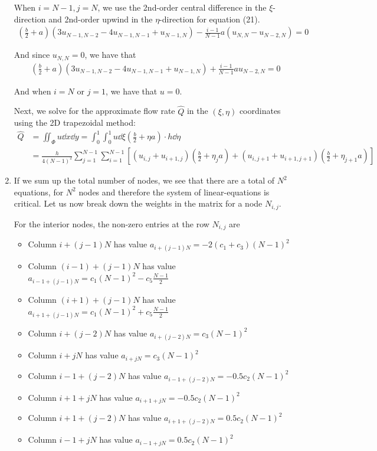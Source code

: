 \begin{enumerate}[label=(\roman*),leftmargin=*,itemsep=0mm]
    When $i = N-1, j = N$, we use the 2nd-order central difference in the $\xi$-direction and 2nd-order upwind in the $\eta$-direction for equation (21).
    \begin{align*}
        \left(\frac{b}{2} + a\right) \left(3u_{N-1,N-2} - 4u_{N-1,N-1} + u_{N-1,N} \right)
        - \frac{i-1}{N-1} a \left( u_{N,N} - u_{N-2,N} \right) = 0
    \end{align*}
    
    And since $u_{N,N} = 0$, we have that
    \begin{align}
        \left(\frac{b}{2} + a\right) \left(3u_{N-1,N-2} - 4u_{N-1,N-1} + u_{N-1,N} \right)
        + \frac{i-1}{N-1} a u_{N-2,N} = 0
    \end{align}
    
    And when $i=N$ or $j=1$, we have that $u=0$.
    
    Next, we solve for the approximate flow rate $\hat{Q}$ in the $(\xi,\eta)$ coordinates using the 2D trapezoidal method:
    \begin{align*}
        \hat{Q} &= \iint_\Phi u \dd{x}\dd{y} 
        = \int_0^1\int_0^1 u \dd{\xi} \left(\frac{b}{2} + \eta a\right) \cdot h\dd{\eta} \\
        &= \frac{h}{4(N-1)^2}\sum_{j=1}^{N-1} \sum_{i=1}^{N-1} 
        \left[ (u_{i,j}+u_{i+1,j})\left(\frac{b}{2} + \eta_{j} a\right)
        + (u_{i,j+1}+u_{i+1,j+1})\left(\frac{b}{2} + \eta_{j+1} a\right)\right]
    \end{align*}
    
    \item If we sum up the total number of nodes, we see that there are a total of $N^2$ equations, for $N^2$ nodes and therefore the system of linear-equations is critical.  Let us now break down the weights in the matrix for a node $N_{i,j}$.
    
    For the interior nodes, the non-zero entries at the row $N_{i,j}$ are
    \begin{itemize}[noitemsep,nolistsep]
        \item Column $i + (j-1)N$ has value $a_{i + (j-1)N} = -2(c_1+c_3)(N-1)^2$
        \item Column $(i-1) + (j-1)N$ has value $a_{i-1 + (j-1)N} = c_1(N-1)^2-c_5\frac{N-1}{2}$
        \item Column $(i+1) + (j-1)N$ has value $a_{i+1 + (j-1)N} = c_1(N-1)^2+c_5\frac{N-1}{2}$
        \item Column $i + (j-2)N$ has value $a_{i + (j-2)N} = c_3(N-1)^2$
        \item Column $i + jN$ has value $a_{i + jN} = c_3(N-1)^2$
        \item Column $i-1 + (j-2)N$ has value $a_{i-1 + (j-2)N} = -0.5c_2(N-1)^2$
        \item Column $i+1 + jN$ has value $a_{i+1 + jN} = -0.5c_2(N-1)^2$
        \item Column $i+1 + (j-2)N$ has value $a_{i+1 + (j-2)N} = 0.5c_2(N-1)^2$
        \item Column $i-1 + jN$ has value $a_{i-1 + jN} = 0.5c_2(N-1)^2$
    \end{itemize}
    

\end{enumerate}
